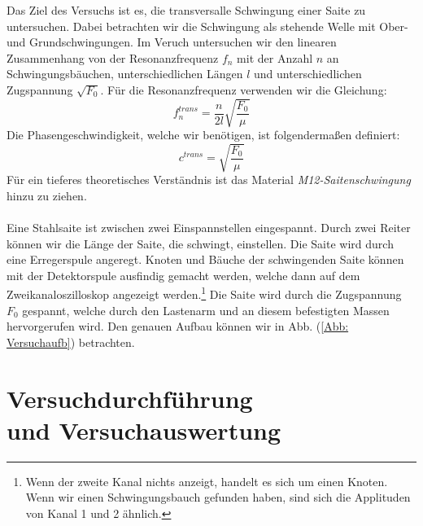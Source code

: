\documentclass[bibliography=totocnumbered]{scrartcl}
\begin{document}
	Das Ziel des Versuchs ist es, die transversalle Schwingung einer Saite zu untersuchen. Dabei betrachten wir die Schwingung als stehende Welle mit Ober- und Grundschwingungen. Im Veruch untersuchen wir den linearen Zusammenhang von der Resonanzfrequenz $ f_{n} $ mit der Anzahl $ n $ an Schwingungsbäuchen, unterschiedlichen Längen $ l $ und unterschiedlichen Zugspannung $ \sqrt{F_{0} }$. Für die Resonanzfrequenz verwenden wir die Gleichung:
	\begin{equation}\label{eq: Resonanzfrequenz}
		f_{n}^{trans}=\dfrac{n}{2l}\sqrt{\dfrac{F_{0}}{\mu}}
	\end{equation}
	Die Phasengeschwindigkeit, welche wir benötigen, ist folgendermaßen definiert:
	\begin{equation}\label{eq: Phasengeschwindigkeit}
		c^{trans}=\sqrt{\dfrac{F_{0}}{\mu}}
	\end{equation}
	Für ein tieferes theoretisches Verständnis ist das Material \textit{M12-Saitenschwingung} hinzu zu ziehen.\\
	\\
  	Eine Stahlsaite ist zwischen zwei Einspannstellen eingespannt. Durch zwei Reiter können wir die Länge der Saite, die schwingt, einstellen. Die Saite wird durch eine Erregerspule angeregt. Knoten und Bäuche der schwingenden Saite können mit der Detektorspule ausfindig gemacht werden, welche dann auf dem Zweikanaloszilloskop angezeigt werden.\footnote{Wenn der zweite Kanal nichts anzeigt, handelt es sich um einen Knoten. Wenn wir einen Schwingungsbauch gefunden haben, sind sich die Applituden von Kanal 1 und 2 ähnlich.} Die Saite wird durch die Zugspannung $ F_{0} $ gespannt, welche durch den Lastenarm und an diesem befestigten Massen hervorgerufen wird. Den genauen Aufbau können wir in Abb. (\ref{Abb: Versuchaufb}) betrachten.
	
	\newpage
	\section{Versuchdurchführung \\und Versuchauswertung}
	
\end{document}
